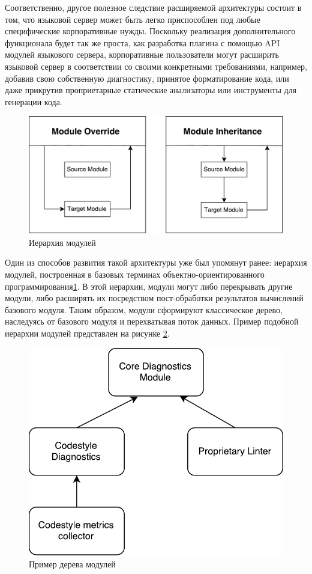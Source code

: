 Соответственно, другое полезное следствие расширяемой архитектуры состоит в том, что языковой сервер может быть легко приспособлен под любые специфические корпоративные нужды. Поскольку реализация дополнительного функционала будет так же проста, как разработка плагина с помощью API модулей языкового сервера, корпоративные пользователи могут расширить языковой сервер в соответствии со своими конкретными требованиями, например, добавив свою собственную диагностику, принятое форматирование кода, или даже прикрутив проприетарные статические анализаторы или инструменты для генерации кода.

\begin{figure}[H]
    \centering
    \includegraphics[width=.7\textwidth]{figs/module_hierarchy.pdf}
    \caption{Иерархия модулей}
    \label{fig:met:module_hierarchy}
\end{figure}

Один из способов развития такой архитектуры уже был упомянут ранее: иерархия модулей, построенная в базовых терминах объектно-ориентированного программирования\ref{fig:met:module_hierarchy}. В этой иерархии, модули могут либо перекрывать другие модули, либо расширять их посредством пост-обработки результатов вычислений базового модуля. Таким образом, модули сформируют классическое дерево, наследуясь от базового модуля и перехватывая поток данных. Пример подобной иерархии модулей представлен на рисунке \ref{fig:met:module_tree}.

\begin{figure}[H]
    \centering
    \includegraphics[width=.5\textwidth]{figs/module_tree.pdf}
    \caption{Пример дерева модулей}
    \label{fig:met:module_tree}
\end{figure}


